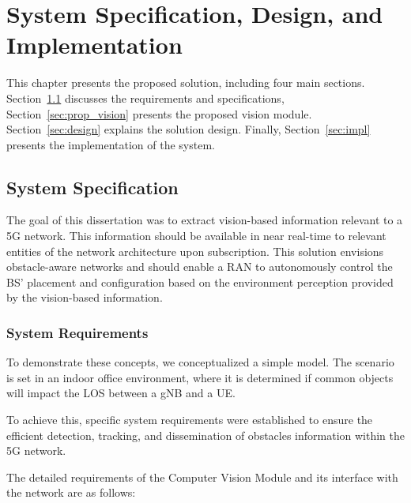 \chapter{System Specification, Design, and Implementation}\label{ch:specs_design_implem}

This chapter presents the proposed solution, including four main sections.
Section~\ref{sec:specs} discusses the requirements and specifications, Section~\ref{sec:prop_vision} presents the proposed vision module.
Section~\ref{sec:design} explains the solution design.
Finally, Section~\ref{sec:impl} presents the implementation of the system.

\section{System Specification}\label{sec:specs}
The goal of this dissertation was to extract vision-based information relevant to a 5G network.
This information should be available in near real-time to relevant entities of the network architecture upon subscription.
This solution envisions obstacle-aware networks and should enable a RAN to autonomously control the BS' placement and configuration based on the environment perception provided by the vision-based information.

\subsection{System Requirements}\label{subsec:system-requirements}

To demonstrate these concepts, we conceptualized a simple model.
The scenario is set in an indoor office environment, where it is determined if common objects will impact the LOS between a gNB and a UE\@.

To achieve this, specific system requirements were established to ensure the efficient detection, tracking, and dissemination of obstacles information within the 5G network.

The detailed requirements of the Computer Vision Module and its interface with the network are as follows:

